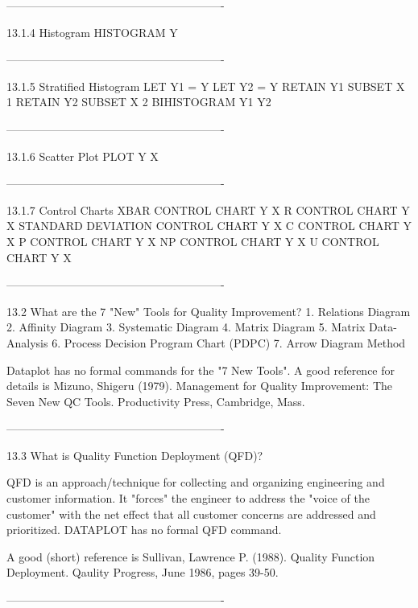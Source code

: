 ----------------------------------------------------------
 
13.1.4
Histogram
      HISTOGRAM Y
 
----------------------------------------------------------
 
13.1.5
Stratified Histogram
      LET Y1 = Y
      LET Y2 = Y
      RETAIN Y1 SUBSET X 1
      RETAIN Y2 SUBSET X 2
      BIHISTOGRAM Y1 Y2
 
----------------------------------------------------------
 
13.1.6
Scatter Plot
      PLOT Y X
 
----------------------------------------------------------
 
13.1.7
Control Charts
      XBAR CONTROL CHART Y X
      R CONTROL CHART Y X
      STANDARD DEVIATION CONTROL CHART Y X
      C CONTROL CHART Y X
      P CONTROL CHART Y X
      NP CONTROL CHART Y X
      U CONTROL CHART Y X
 
----------------------------------------------------------
 
13.2
What are the 7 "New" Tools for Quality Improvement?
   1. Relations Diagram
   2. Affinity Diagram
   3. Systematic Diagram
   4. Matrix Diagram
   5. Matrix Data-Analysis
   6. Process Decision Program Chart (PDPC)
   7. Arrow Diagram Method
 
      Dataplot has no formal commands for the "7 New Tools".
      A good reference for details is
            Mizuno, Shigeru (1979).  Management for Quality
            Improvement:  The Seven New QC Tools.  Productivity
            Press, Cambridge, Mass.
 
----------------------------------------------------------
 
13.3
What is Quality Function Deployment (QFD)?
 
      QFD is an approach/technique for collecting
      and organizing engineering and customer information.
      It "forces" the engineer to address the "voice of
      the customer" with the net effect that all customer
      concerns are addressed and prioritized.
      DATAPLOT has no formal QFD command.
 
      A good (short) reference is
            Sullivan, Lawrence P. (1988).  Quality Function
            Deployment.  Qaulity Progress, June 1986,
            pages 39-50.
 
----------------------------------------------------------
 
 
 
